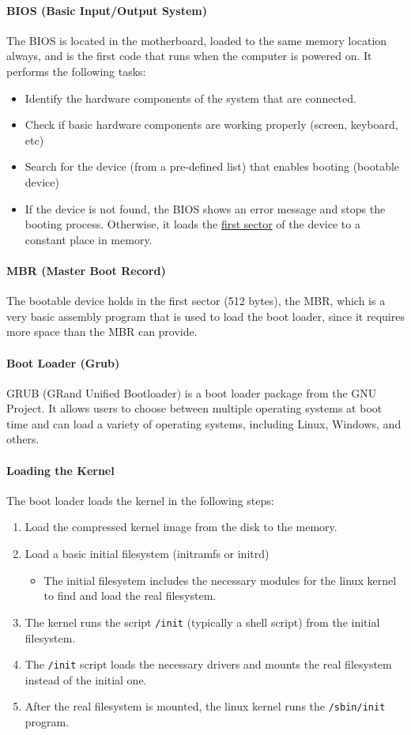 \documentclass[openany,12pt]{book}
\newcommand{\code}[1]{\texttt{#1}}
\begin{document}
\paragraph{BIOS (Basic Input/Output System)} The BIOS is located in the motherboard, loaded to the same memory location always, and is the first code that runs when the computer is powered on. It performs the following tasks:
\begin{itemize}
  \item Identify the hardware components of the system that are connected.
  \item Check if basic hardware components are working properly (screen, keyboard, etc)
  \item Search for the device (from a pre-defined list) that enables booting (bootable device)
  \item If the device is not found, the BIOS shows an error message and stops the booting process. Otherwise, it loads the \ul{first sector} of the device to a constant place in memory.
\end{itemize}


\paragraph{MBR (Master Boot Record)} The bootable device holds in the first sector (512 bytes), the MBR, which is a very basic assembly program that is used to load the boot loader, since it requires more space than the MBR can provide. 

\paragraph{Boot Loader (Grub)} GRUB (GRand Unified Bootloader) is a boot loader package from the GNU Project. It allows users to choose between multiple operating systems at boot time and can load a variety of operating systems, including Linux, Windows, and others. 


\paragraph{Loading the Kernel} The boot loader loads the kernel in the following steps:
\begin{enumerate}
  \item Load the compressed kernel image from the disk to the memory.
  \item Load a basic initial filesystem (initramfs or initrd)
  \begin{itemize}
    \item The initial filesystem includes the necessary modules for the linux kernel to find and load the real filesystem.
  \end{itemize}
  \item The kernel runs the script \code{/init} (typically a shell script) from the initial filesystem.
  \item The \code{/init} script loads the necessary drivers and mounts the real filesystem instead of the initial one.
  \item After the real filesystem is mounted, the linux kernel runs the \code{/sbin/init} program.
\end{enumerate}
\end{document}
